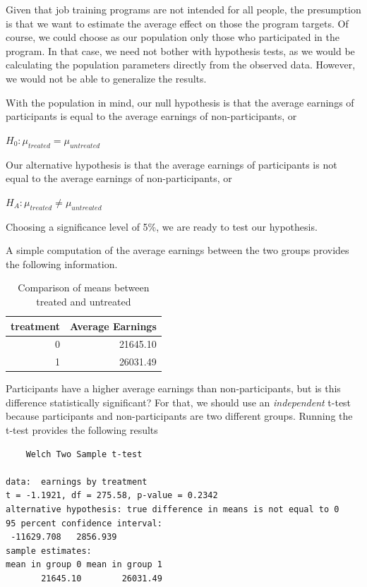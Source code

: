 \documentclass[
]{book}
\begin{document}
Given that job training programs are not intended for all people, the presumption is that we want to estimate the average effect on those the program targets. Of course, we could choose as our population only those who participated in the program. In that case, we need not bother with hypothesis tests, as we would be calculating the population parameters directly from the observed data. However, we would not be able to generalize the results.

With the population in mind, our null hypothesis is that the average earnings of participants is equal to the average earnings of non-participants, or

\(H_0: \mu_{treated} = \mu_{untreated}\)

Our alternative hypothesis is that the average earnings of participants is not equal to the average earnings of non-participants, or

\(H_A: \mu_{treated} \neq \mu_{untreated}\)

Choosing a significance level of 5\%, we are ready to test our hypothesis.

A simple computation of the average earnings between the two groups provides the following information.

\begin{table}

\caption{\label{tab:jobtrainsum}Comparison of means between treated and untreated}
\centering
\begin{tabular}[t]{r|r}
\hline
treatment & Average Earnings\\
\hline
0 & 21645.10\\
\hline
1 & 26031.49\\
\hline
\end{tabular}
\end{table}

Participants have a higher average earnings than non-participants, but is this difference statistically significant? For that, we should use an \emph{independent} t-test because participants and non-participants are two different groups. Running the t-test provides the following results

\begin{verbatim}
	Welch Two Sample t-test

data:  earnings by treatment
t = -1.1921, df = 275.58, p-value = 0.2342
alternative hypothesis: true difference in means is not equal to 0
95 percent confidence interval:
 -11629.708   2856.939
sample estimates:
mean in group 0 mean in group 1 
       21645.10        26031.49 
\end{verbatim}
\end{document}
